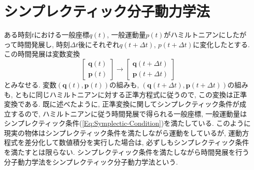 \section{シンプレクティック分子動力学法}
ある時刻$t$における一般座標$q(t)$, 一般運動量$p(t)$がハミルトニアンにしたがって時間発展し, 時刻$\Delta t$後にそれぞれ$q(t + \Delta t)$, $p(t + \Delta t)$に変化したとする. この時間発展は変数変換
\begin{equation}
  \begin{bmatrix}
    \bm{q}(t) \\
    \bm{p}(t)
  \end{bmatrix}
  \to
  \begin{bmatrix}
    \bm{q}(t + \Delta t) \\
    \bm{p}(t + \Delta t)
  \end{bmatrix}
\end{equation}
とみなせる. 
変数$(\bm{q}(t),\bm{p}(t))$の組みも, $(\bm{q}(t + \Delta t),\bm{p}(t + \Delta t))$の組みも, ともに同じハミルトニアンに対する正準方程式に従うので, この変換は正準変換である. 既に述べたように, 正準変換に関してシンプレクティック条件が成立するので, ハミルトニアンに従う時間発展で得られる一般座標, 一般運動量はシンプレクティック条件(\ref{Eq:Symplectic-Condition})を満たしている. 
このように現実の物体はシンプレクティック条件を満たしながら運動をしているが, 運動方程式を差分化して数値積分を実行した場合は, 必ずしもシンプレクティック条件を満たすとは限らない. 
シンプレクティック条件を満たしながら時間発展を行う分子動力学法をシンプレクティック分子動力学法という. 

